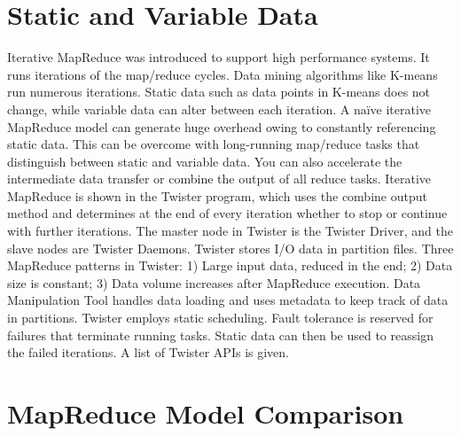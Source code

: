 


\section{Static and Variable Data}

Iterative MapReduce was introduced to support high performance systems.
It runs iterations of the map/reduce cycles. Data mining algorithms like
K-means run numerous iterations. Static data such as data points in
K-means does not change, while variable data can alter between each
iteration. A naïve iterative MapReduce model can generate huge overhead
owing to constantly referencing static data. This can be overcome with
long-running map/reduce tasks that distinguish between static and
variable data. You can also accelerate the intermediate data transfer or
combine the output of all reduce tasks. Iterative MapReduce is shown in
the Twister program, which uses the combine output method and determines
at the end of every iteration whether to stop or continue with further
iterations. The master node in Twister is the Twister Driver, and the
slave nodes are Twister Daemons. Twister stores I/O data in partition
files. Three MapReduce patterns in Twister: 1) Large input data, reduced
in the end; 2) Data size is constant; 3) Data volume increases after
MapReduce execution. Data Manipulation Tool handles data loading and
uses metadata to keep track of data in partitions. Twister employs
static scheduling. Fault tolerance is reserved for failures that
terminate running tasks. Static data can then be used to reassign the
failed iterations. A list of Twister APIs is given.




\section{MapReduce Model Comparison}

